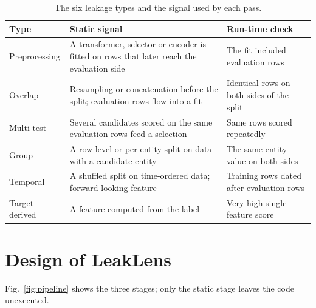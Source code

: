 \documentclass[conference]{IEEEtran}
\begin{document}
\begin{table}[t]
\caption{The six leakage types and the signal used by each pass.}
\label{tab:types}
\scriptsize
\begin{tabularx}{\columnwidth}{@{}>{\raggedright\arraybackslash}p{}>{\raggedright\arraybackslash}X>{\raggedright\arraybackslash}X@{}}
\toprule
\textbf{Type} & \textbf{Static signal} & \textbf{Run-time check} \\
\midrule
Preprocessing & A transformer, selector or encoder is fitted on rows that later reach the evaluation side & The fit included evaluation rows \\
Overlap & Resampling or concatenation before the split; evaluation rows flow into a fit & Identical rows on both sides of the split \\
Multi-test & Several candidates scored on the same evaluation rows feed a selection & Same rows scored repeatedly \\
Group & A row-level or per-entity split on data with a candidate entity & The same entity value on both sides \\
Temporal & A shuffled split on time-ordered data; forward-looking feature & Training rows dated after evaluation rows \\
Target-derived & A feature computed from the label & Very high single-feature score \\
\bottomrule
\end{tabularx}
\end{table}

\section{Design of LeakLens}

Fig.~\ref{fig:pipeline} shows the three stages; only the static stage leaves the code unexecuted.
\end{document}
